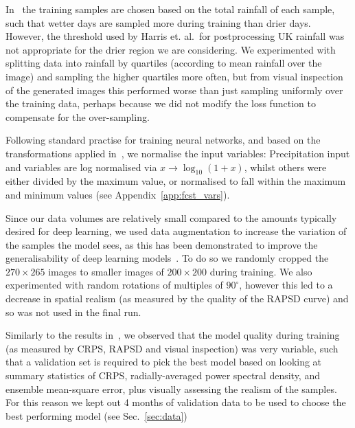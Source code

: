 \documentclass{article}
\begin{document}
In~\cite{harris_generative_2022} the training samples are chosen based on the total rainfall of each sample, such that wetter days are sampled more during training than drier days. However, the threshold used by Harris et. al.~for postprocessing UK rainfall was not appropriate for the drier region we are considering. We experimented with splitting data into rainfall by quartiles (according to mean rainfall over the image) and sampling the higher quartiles more often, but from visual inspection of the generated images this performed worse than just sampling uniformly over the training data, perhaps because we did not modify the loss function to compensate for the over-sampling.

Following standard practise for training neural networks, and based on the transformations applied in~\cite{harris_generative_2022}, we normalise the input variables: Precipitation input and variables are log normalised via $x \to \log_{10}(1 + x)$, whilst others were either divided by the maximum value, or normalised to fall within the maximum and minimum values (see Appendix~\ref{app:fcst_vars}).


Since our data volumes are relatively small compared to the amounts typically desired for deep learning, we used data augmentation to increase the variation of the samples the model sees, as this has been demonstrated to improve the generalisability of deep learning models~\citep{goodfellow_deep_2016}. To do so we randomly cropped the $270 \times 265$ images to smaller images of $200 \times 200$ during training. We also experimented with random rotations of multiples of $90^{\circ}$, however this led to a decrease in spatial realism (as measured by the quality of the RAPSD curve) and so was not used in the final run.



Similarly to the results in~\cite{harris_generative_2022}, we observed that the model quality during training (as measured by CRPS, RAPSD and visual inspection) was very variable, such that a validation set is required to pick the best model based on looking at summary statistics of CRPS, radially-averaged power spectral density, and ensemble mean-square error, plus visually assessing the realism of the samples. For this reason we kept out 4 months of validation data to be used to choose the best performing model (see Sec.~\ref{sec:data})
\end{document}
